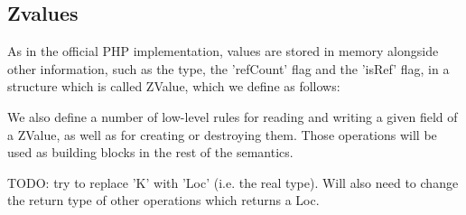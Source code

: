 \documentclass{article}
\begin{document}
\begin{kdefinition}
\begin{module}{}
\begin{syntaxBlock}{}
\end{syntaxBlock}
\begin{kblock}[text]
 \subsection{Zvalues} 
		As in the official PHP implementation, values are stored in memory alongside other 
		information, such as the type, the 'refCount' flag and the 'isRef' flag, in a structure
		which is called ZValue, which we define as follows:	 \end{kblock}

\begin{syntaxBlock}{}
\end{syntaxBlock}
\begin{kblock}[text]
 We also define a number of low-level rules for reading and writing a given field of a 
	ZValue, as well as for creating or destroying them. Those operations will be used as 
	building blocks in the rest of the semantics. \end{kblock}

\begin{syntaxBlock}{}
\end{syntaxBlock}
\begin{kblock}[text]
 TODO: try to replace 'K' with 'Loc' (i.e. the real type). Will also need to change 
    the return type of other operations which returns a Loc.  \end{kblock}


\end{module}
\end{kdefinition}
\end{document}
